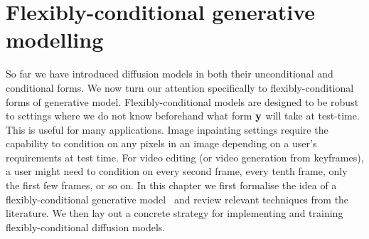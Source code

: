 \chapter{Flexibly-conditional generative modelling}
\label{ch:flexible-diffusion}

So far we have introduced diffusion models in both their unconditional and conditional forms. We now turn our attention specifically to flexibly-conditional forms of generative model. 
%
%
Flexibly-conditional models are designed to be robust to settings where we do not know beforehand what form ${\mathbf{y}}$ will take at test-time. This is useful for many applications. Image inpainting settings require the capability to condition on any pixels in an image depending on a user's requirements at test time. For video editing (or video generation from keyframes), a user might need to condition on every second frame, every tenth frame, only the first few frames, or so on. In this chapter we first formalise the idea of a flexibly-conditional generative model~\citep{ivanov2018variational} and review relevant techniques from the literature. We then lay out a concrete strategy for implementing and training flexibly-conditional diffusion models.


